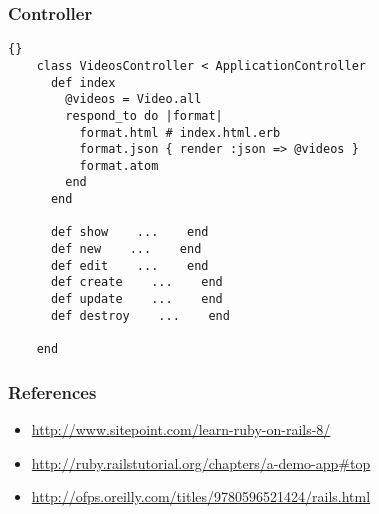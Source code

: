 \documentclass{beamer}
\begin{document}
\lstset{language=Ruby}
\begin{frame}[fragile]
  \frametitle{Controller}
  \begin{lstlisting}{}
    class VideosController < ApplicationController
      def index
        @videos = Video.all
        respond_to do |format|
          format.html # index.html.erb
          format.json { render :json => @videos }
          format.atom
        end
      end

      def show    ...    end
      def new    ...    end
      def edit    ...    end
      def create    ...    end
      def update    ...    end
      def destroy    ...    end

    end
  \end{lstlisting}
\end{frame}

\begin{frame}
  \frametitle{References}
  \begin{itemize}
    \item \url{http://www.sitepoint.com/learn-ruby-on-rails-8/} \bigskip
    \item \url{http://ruby.railstutorial.org/chapters/a-demo-app\#top} \bigskip
    \item \url{http://ofps.oreilly.com/titles/9780596521424/rails.html}
  \end{itemize}
\end{frame}
\end{document}
